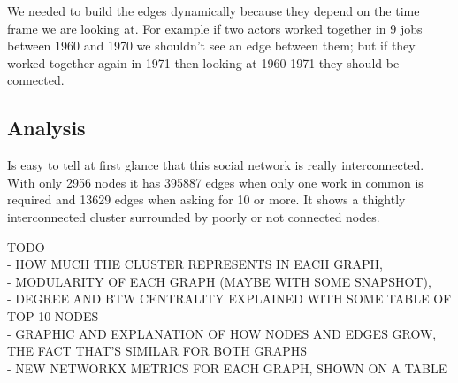 We needed to build the edges dynamically because they depend on the time frame we are looking at. For example if two actors worked together in 9 jobs between 1960 and 1970 we shouldn't see an edge between them; but if they worked together again in 1971 then looking at 1960-1971 they should be connected.

\subsection{Analysis}
Is easy to tell at first glance that this social network is really interconnected. With only 2956 nodes it has 395887 edges when only one work in common is required and 13629 edges when asking for 10 or more. It shows a thightly interconnected cluster surrounded by poorly or not connected nodes. 

TODO \\
- HOW MUCH THE CLUSTER REPRESENTS IN EACH GRAPH, \\
- MODULARITY OF EACH GRAPH (MAYBE WITH SOME SNAPSHOT), \\
- DEGREE AND BTW CENTRALITY EXPLAINED WITH SOME TABLE OF TOP 10 NODES\\
- GRAPHIC AND EXPLANATION OF HOW NODES AND EDGES GROW, THE FACT THAT'S SIMILAR FOR BOTH GRAPHS\\
- NEW NETWORKX METRICS FOR EACH GRAPH, SHOWN ON A TABLE\\



